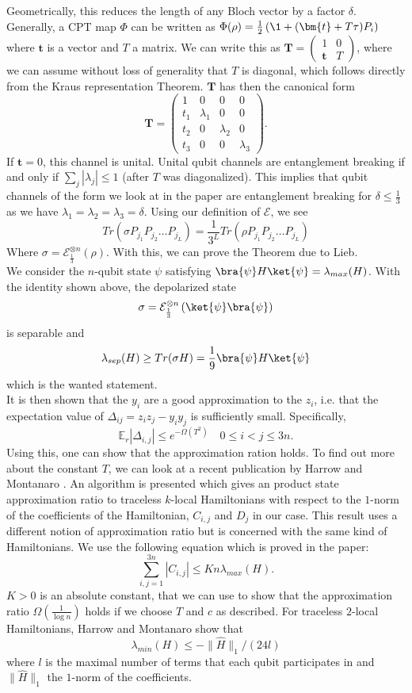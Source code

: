 Geometrically, this reduces the length of any Bloch vector by a factor $\delta$.
Generally, a CPT map $\Phi$ can be written as $\Phi(\rho)=\frac{1}{2}\left( \1 + (\bm{t}+T\tau)P_i \right)$ where $\bm{t}$ is a vector and $T$ a matrix.\cite{ruskai03}
We can write this as $\bm{T}=\begin{pmatrix}
	1 & 0 \\
	\bm{t} & T
\end{pmatrix} $, where we can assume without loss of generality that $T$ is diagonal, which follows directly from the Kraus representation Theorem.
$\bm{T}$ has then the canonical form \[
\bm{T} = \begin{pmatrix}
	1 & 0 & 0 & 0\\
	t_1 & \lambda_1 & 0 & 0\\
	t_2 & 0 & \lambda_2 & 0 \\
	t_3 & 0 & 0 & \lambda_3
\end{pmatrix}
.\]
If $\bm{t}=0$, this channel is unital.
Unital qubit channels are entanglement breaking if and only if $\sum_{j} \left| \lambda_j \right| \le 1$ (after $T$ was diagonalized).\cite{ruskai03}
This implies that qubit channels of the form we look at in the paper are entanglement breaking for $\delta\le \frac{1}{3}$ as we have $\lambda_1=\lambda_2=\lambda_3=\delta$.
Using our definition of $\mathcal{E}$, we see \[
	Tr\left( \sigma P_{j_1}P_{j_2}\ldots P_{j_L} \right) = \frac{1}{3^L}Tr\left( \rho P_{j_1}P_{j_2}\ldots P_{j_L} \right)
\]
Where $\sigma=\mathcal{E}^{\otimes n}_{\frac{1}{3}}(\rho)$.
With this, we can prove the Theorem due to Lieb.\\
We consider the $n$-qubit state $\psi$ satisfying $\bra{\psi}H\ket{\psi}=\lambda_{max}(H)$.
With the identity shown above, the depolarized state \[
	\sigma = \mathcal{E}^{\otimes n}_{\frac{1}{3}}\left( \ket{\psi}\bra{\psi} \right)
\] is separable and \[
\lambda_{sep}(H) \ge Tr(\sigma H)=\frac{1}{9}\bra{\psi}H\ket{\psi}
\] which is the wanted statement.\\
It is then shown that the $y_i$ are a good approximation to the $z_i$, i.e. that the expectation value of $\Delta_{ij}=z_iz_j-y_iy_j$ is sufficiently small.
Specifically, \[
	\mathbb{E}_r\left| \Delta_{i,j} \right|  \le e^{-\Omega(T^2)} \quad 0\le i<j\le 3n
.\]
Using this, one can show that the approximation ration holds.
To find out more about the constant $T$, we can look at a recent publication by Harrow and Montanaro \cite{harrow17}.
An algorithm is presented which gives an product state approximation ratio to traceless $k$-local Hamiltonians with respect to the $1$-norm of the coefficients of the Hamiltonian, $C_{i,j}$ and $D_j$ in our case.
This result uses a different notion of approximation ratio but is concerned with the same kind of Hamiltonians.
We use the following equation which is proved in the paper: \[
	\sum_{i,j=1}^{3n} \left| C_{i,j} \right| \le Kn\lambda_{max}(H)
.\]
$K>0$ is an absolute constant, that we can use to show that the approximation ratio $\Omega(\frac{1}{\log{}n})$ holds if we choose $T$ and $c$ as described.
For traceless $2$-local Hamiltonians, Harrow and Montanaro show that \[
	\lambda_{min}(H)\le - \|\hat{H}\|_1/(24l)
\]
where $l$ is the maximal number of terms that each qubit participates in and $\|\hat{H}\|_1$ the $1$-norm of the coefficients.
